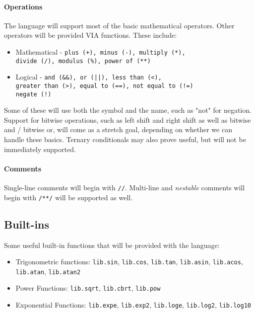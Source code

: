 \paragraph{Operations}
The \lepix{} language will support most of the basic mathematical operators. Other operators will be provided VIA functions. These include:

\begin{itemize}
	\item Mathematical - \verb|plus (+), minus (-), multiply (*),|\\
	\verb|divide (/), modulus (%), power of (**)|
	\item Logical - \verb+and (&&), or (||), less than (<),+\\
	\verb+greater than (>), equal to (==), not equal to (!=)+\\
	\verb+negate (!)+
\end{itemize}

Some of these will use both the symbol and the name, such as "not" for negation. Support for bitwise operations, such as left shift and right shift as well as bitwise and / bitwise or, will come as a stretch goal, depending on whether we can handle these basics. Ternary conditionals may also prove useful, but will not be immediately supported.

\paragraph{Comments}
Single-line comments will begin with \lstinline|//|. Multi-line and \emph{nestable} comments will begin with \lstinline|/**/| will be supported as well.

\subsection{Built-ins}
Some useful built-in functions that will be provided with the language:

\begin{itemize}
	\item Trigonometric functions: \lstinline|lib.sin|, \lstinline|lib.cos|, \lstinline|lib.tan|, \lstinline|lib.asin|, \lstinline|lib.acos|, \lstinline|lib.atan|, \lstinline|lib.atan2|
	\item Power Functions: \lstinline|lib.sqrt|, \lstinline|lib.cbrt|, \lstinline|lib.pow|
	\item Exponential Functions: \lstinline|lib.expe|, \lstinline|lib.exp2|, \lstinline|lib.loge|, \lstinline|lib.log2|, \lstinline|lib.log10|
\end{itemize}

